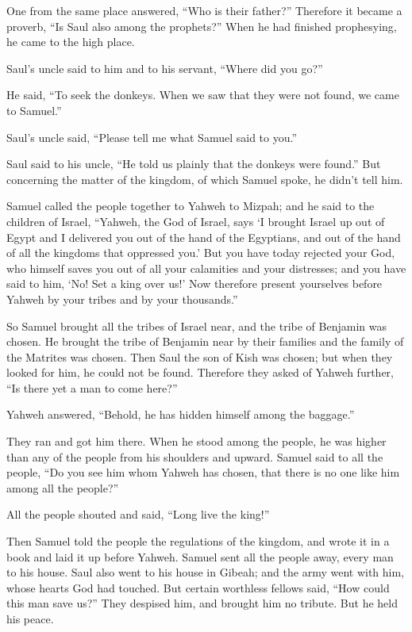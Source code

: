  One from the same place answered, ``Who is their father?''
Therefore it became a proverb, ``Is Saul also among the prophets?''
 When he had finished prophesying, he came to the high
place.

 Saul's uncle said to him and to his servant, ``Where did
you go?''

He said, ``To seek the donkeys. When we saw that they were not found, we
came to Samuel.''

 Saul's uncle said, ``Please tell me what Samuel said to
you.''

 Saul said to his uncle, ``He told us plainly that the
donkeys were found.'' But concerning the matter of the kingdom, of which
Samuel spoke, he didn't tell him.

 Samuel called the people together to Yahweh to Mizpah;
 and he said to the children of Israel, ``Yahweh, the God
of Israel, says `I brought Israel up out of Egypt and I delivered you
out of the hand of the Egyptians, and out of the hand of all the
kingdoms that oppressed you.'  But you have today rejected
your God, who himself saves you out of all your calamities and your
distresses; and you have said to him, `No! Set a king over us!' Now
therefore present yourselves before Yahweh by your tribes and by your
thousands.''

 So Samuel brought all the tribes of Israel near, and the
tribe of Benjamin was chosen.  He brought the tribe of
Benjamin near by their families and the family of the Matrites was
chosen. Then Saul the son of Kish was chosen; but when they looked for
him, he could not be found.  Therefore they asked of Yahweh
further, ``Is there yet a man to come here?''

Yahweh answered, ``Behold, he has hidden himself among the baggage.''

 They ran and got him there. When he stood among the
people, he was higher than any of the people from his shoulders and
upward.  Samuel said to all the people, ``Do you see him
whom Yahweh has chosen, that there is no one like him among all the
people?''

All the people shouted and said, ``Long live the king!''

 Then Samuel told the people the regulations of the
kingdom, and wrote it in a book and laid it up before Yahweh. Samuel
sent all the people away, every man to his house.  Saul
also went to his house in Gibeah; and the army went with him, whose
hearts God had touched.  But certain worthless fellows
said, ``How could this man save us?'' They despised him, and brought him
no tribute. But he held his peace.

